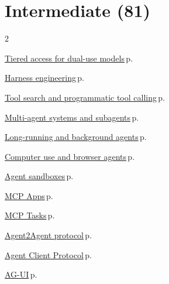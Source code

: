 \documentclass[10pt,a4paper,openany]{report}
\begin{document}
\section{Intermediate (81)}
\begin{multicols}{2}\small\raggedright
\hyperref[c:landscape-2]{Tiered access for dual-use models}\,{\color{muted}\scriptsize p.\,\pageref{c:landscape-2}}\par\vspace{1pt}
\hyperref[c:agents-1]{Harness engineering}\,{\color{muted}\scriptsize p.\,\pageref{c:agents-1}}\par\vspace{1pt}
\hyperref[c:agents-6]{Tool search and programmatic tool calling}\,{\color{muted}\scriptsize p.\,\pageref{c:agents-6}}\par\vspace{1pt}
\hyperref[c:agents-7]{Multi-agent systems and subagents}\,{\color{muted}\scriptsize p.\,\pageref{c:agents-7}}\par\vspace{1pt}
\hyperref[c:agents-8]{Long-running and background agents}\,{\color{muted}\scriptsize p.\,\pageref{c:agents-8}}\par\vspace{1pt}
\hyperref[c:agents-9]{Computer use and browser agents}\,{\color{muted}\scriptsize p.\,\pageref{c:agents-9}}\par\vspace{1pt}
\hyperref[c:agents-11]{Agent sandboxes}\,{\color{muted}\scriptsize p.\,\pageref{c:agents-11}}\par\vspace{1pt}
\hyperref[c:protocols-1]{MCP Apps}\,{\color{muted}\scriptsize p.\,\pageref{c:protocols-1}}\par\vspace{1pt}
\hyperref[c:protocols-2]{MCP Tasks}\,{\color{muted}\scriptsize p.\,\pageref{c:protocols-2}}\par\vspace{1pt}
\hyperref[c:protocols-3]{Agent2Agent protocol}\,{\color{muted}\scriptsize p.\,\pageref{c:protocols-3}}\par\vspace{1pt}
\hyperref[c:protocols-7]{Agent Client Protocol}\,{\color{muted}\scriptsize p.\,\pageref{c:protocols-7}}\par\vspace{1pt}
\hyperref[c:protocols-8]{AG-UI}\,{\color{muted}\scriptsize p.\,\pageref{c:protocols-8}}\par\vspace{1pt}

\end{multicols}
\end{document}
